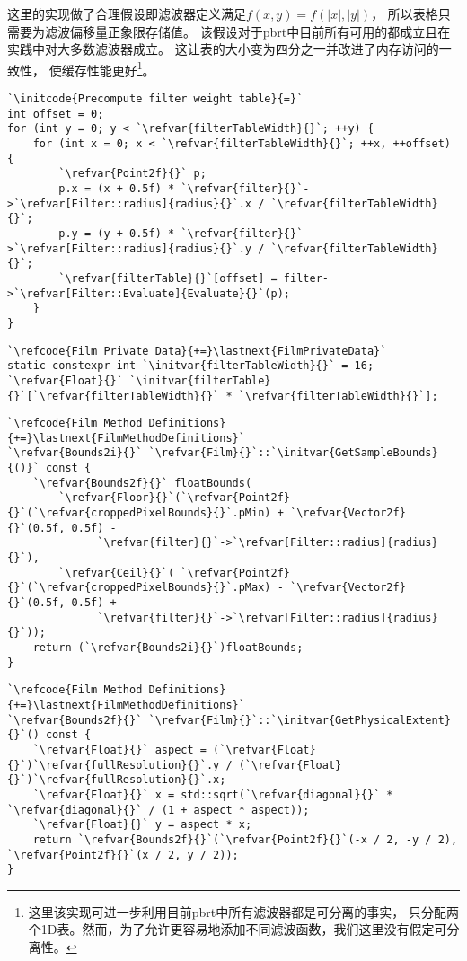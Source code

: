 这里的实现做了合理假设即滤波器定义满足$f(x,y)=f(|x|,|y|)$，
所以表格只需要为滤波偏移量正象限存储值。
该假设对于pbrt中目前所有可用的都成立且在实践中对大多数滤波器成立。
这让表的大小变为四分之一并改进了内存访问的一致性，
使缓存性能更好\footnote{这里该实现可进一步利用目前pbrt中所有滤波器都是可分离的事实，
只分配两个1D表。然而，为了允许更容易地添加不同滤波函数，我们这里没有假定可分离性。}。
\begin{lstlisting}
`\initcode{Precompute filter weight table}{=}`
int offset = 0;
for (int y = 0; y < `\refvar{filterTableWidth}{}`; ++y) {
    for (int x = 0; x < `\refvar{filterTableWidth}{}`; ++x, ++offset) {
        `\refvar{Point2f}{}` p;
        p.x = (x + 0.5f) * `\refvar{filter}{}`->`\refvar[Filter::radius]{radius}{}`.x / `\refvar{filterTableWidth}{}`;
        p.y = (y + 0.5f) * `\refvar{filter}{}`->`\refvar[Filter::radius]{radius}{}`.y / `\refvar{filterTableWidth}{}`;
        `\refvar{filterTable}{}`[offset] = filter->`\refvar[Filter::Evaluate]{Evaluate}{}`(p);
    }
}
\end{lstlisting}
\begin{lstlisting}
`\refcode{Film Private Data}{+=}\lastnext{FilmPrivateData}`
static constexpr int `\initvar{filterTableWidth}{}` = 16;
`\refvar{Float}{}` `\initvar{filterTable}{}`[`\refvar{filterTableWidth}{}` * `\refvar{filterTableWidth}{}`];
\end{lstlisting}

\begin{lstlisting}
`\refcode{Film Method Definitions}{+=}\lastnext{FilmMethodDefinitions}`
`\refvar{Bounds2i}{}` `\refvar{Film}{}`::`\initvar{GetSampleBounds}{()}` const {
    `\refvar{Bounds2f}{}` floatBounds(
        `\refvar{Floor}{}`(`\refvar{Point2f}{}`(`\refvar{croppedPixelBounds}{}`.pMin) + `\refvar{Vector2f}{}`(0.5f, 0.5f) -
              `\refvar{filter}{}`->`\refvar[Filter::radius]{radius}{}`),
        `\refvar{Ceil}{}`( `\refvar{Point2f}{}`(`\refvar{croppedPixelBounds}{}`.pMax) - `\refvar{Vector2f}{}`(0.5f, 0.5f) +
              `\refvar{filter}{}`->`\refvar[Filter::radius]{radius}{}`));
    return (`\refvar{Bounds2i}{}`)floatBounds;
}
\end{lstlisting}
\begin{lstlisting}
`\refcode{Film Method Definitions}{+=}\lastnext{FilmMethodDefinitions}`
`\refvar{Bounds2f}{}` `\refvar{Film}{}`::`\initvar{GetPhysicalExtent}{}`() const {
    `\refvar{Float}{}` aspect = (`\refvar{Float}{}`)`\refvar{fullResolution}{}`.y / (`\refvar{Float}{}`)`\refvar{fullResolution}{}`.x;
    `\refvar{Float}{}` x = std::sqrt(`\refvar{diagonal}{}` * `\refvar{diagonal}{}` / (1 + aspect * aspect));
    `\refvar{Float}{}` y = aspect * x;
    return `\refvar{Bounds2f}{}`(`\refvar{Point2f}{}`(-x / 2, -y / 2), `\refvar{Point2f}{}`(x / 2, y / 2));
}
\end{lstlisting}
